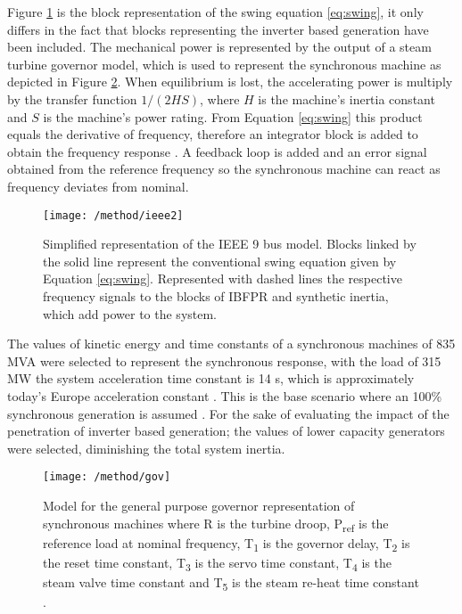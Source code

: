 Figure \ref{fig:ieeesimple} is the block representation of the swing equation \eqref{eq:swing}, it only differs in the fact that blocks representing the inverter based generation have been included. The mechanical power is represented by the output of a steam turbine governor model, which is used to represent the synchronous machine as depicted in Figure \ref{fig:gov}. When equilibrium is lost, the accelerating power is multiply by the transfer function $ 1/(2HS) $, where $ H $ is the machine’s inertia constant and $ S $ is the machine’s power rating. From Equation \eqref{eq:swing} this product equals the derivative of frequency, therefore an integrator block is added to obtain the frequency response \cite{kundur1994power, john1994power, ogata1999ingenieria}. A feedback loop is added and an error signal obtained from the reference frequency so the synchronous machine can react as frequency deviates from nominal. \\

\begin{figure}[h]
	\centering
	\texttt{[image: /method/ieee2]}
	\caption{Simplified representation of the IEEE 9 bus model. Blocks linked by the solid line represent the conventional swing equation given by Equation \eqref{eq:swing}. Represented with dashed lines the respective frequency signals to the blocks of IBFPR and synthetic inertia, which add power to the system.}
	\label{fig:ieeesimple}
\end{figure}


The values of kinetic energy and time constants of a synchronous machines of 835 MVA were selected to represent the synchronous response, with the load of 315 MW the system acceleration time constant is 14 s, which is approximately today’s Europe acceleration constant \cite{ENTSOE.2016}. This is the base scenario where an 100\% synchronous generation is assumed . For the sake of evaluating the impact of the penetration of inverter based generation; the values of lower capacity generators were selected, diminishing the total system inertia.\\%
\begin{figure}[h]
	\centering
	\texttt{[image: /method/gov]}
	\caption{Model for the general purpose governor representation of synchronous machines where R is the turbine droop, P\textsubscript{ref} is the reference load at nominal frequency, T\textsubscript{1} is the governor delay, T\textsubscript{2} is the reset time constant, T\textsubscript{3} is the servo time constant, T\textsubscript{4} is the steam valve time constant and T\textsubscript{5} is the steam re-heat time constant \cite{Anderson.2002}.}
	\label{fig:gov}
\end{figure}

